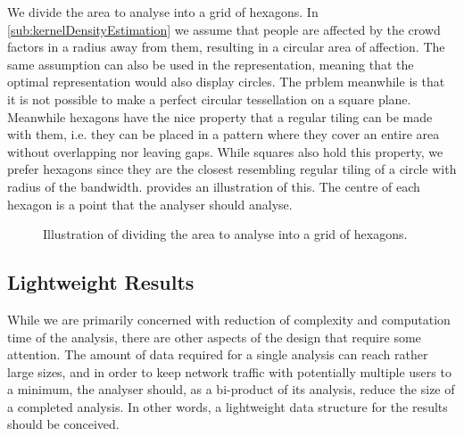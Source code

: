 We divide the area to analyse into a grid of hexagons. In \cref{sub:kernelDensityEstimation} we assume that people are affected by the crowd factors in a radius away from them, resulting in a circular area of affection. The same assumption can also be used in the representation, meaning that the optimal representation would also display circles. The prblem meanwhile is that it is not possible to make a perfect circular tessellation on a square plane. Meanwhile hexagons have the nice property that a regular tiling can be made with them, i.e. they can be placed in a pattern where they cover an entire area without overlapping nor leaving gaps. While squares also hold this property, we prefer hexagons since they are the closest resembling regular tiling of  a circle with radius of the bandwidth.  provides an illustration of this. The centre of each hexagon is a point that the analyser should analyse.

\begin{figure}[htbp]
\centering
{}
\caption{Illustration of dividing the area to analyse into a grid of hexagons.}\label{fig:analysis_hexagon_divide}
\end{figure}


\subsection{Lightweight Results}

While we are primarily concerned with reduction of complexity and computation time of the analysis, there are other aspects of the design that require some attention. The amount of data required for a single analysis can reach rather large sizes, and in order to keep network traffic with potentially multiple users to a minimum, the analyser should, as a bi-product of its analysis, reduce the size of a completed analysis. In other words, a lightweight data structure for the results should be conceived. 

